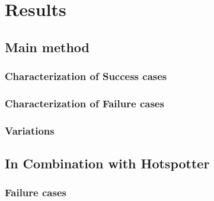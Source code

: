 
\chapter{Results} \label{sec:results}

\section{Main method}

\subsection{Characterization of Success cases}

\subsection{Characterization of Failure cases}

\subsection{Variations}

\section{In Combination with Hotspotter}

\subsection{Failure cases}


